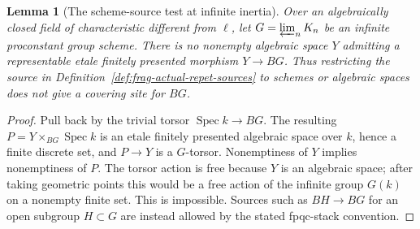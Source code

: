 \documentclass[11pt]{article}
\newtheorem{lemma}[theorem]{Lemma}
\theoremstyle{definition}
\theoremstyle{remark}
\newcommand{\Spec}{\operatorname{Spec}}
\begin{document}
\begin{lemma}[The scheme-source test at infinite inertia]
\label{lem:frag-repet-scheme-source-test}
Over an algebraically closed field of characteristic different from
$\ell$, let $G=\varprojlim_n K_n$ be an infinite proconstant group
scheme.  There is no nonempty algebraic space $Y$ admitting a
representable etale finitely presented morphism $Y\to BG$.
Thus restricting the source in Definition~\ref{def:frag-actual-repet-sources}
to schemes or algebraic spaces does not give a covering site for $BG$.
\end{lemma}

\begin{proof}
Pull back by the trivial torsor $\Spec k\to BG$.  The resulting
$P=Y\times_{BG}\Spec k$ is an etale finitely presented algebraic
space over $k$, hence a finite discrete set, and $P\to Y$ is a
$G$-torsor.  Nonemptiness of $Y$ implies nonemptiness of $P$.
The torsor action is free because $Y$ is an algebraic space; after
taking geometric points this would be a free action of the infinite
group $G(k)$ on a nonempty finite set.  This is impossible.  Sources
such as $BH\to BG$ for an open subgroup $H\subset G$ are instead
allowed by the stated fpqc-stack convention.
\end{proof}
\end{document}
